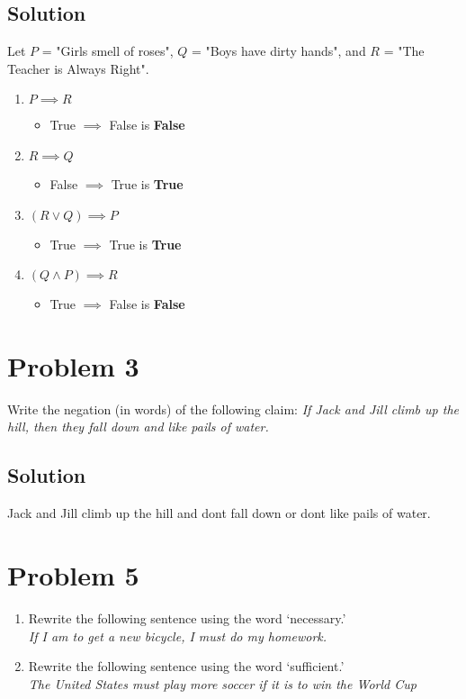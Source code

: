 \documentclass[12pt]{extarticle}
\begin{document}
\subsection*{Solution}

Let $P$ = "Girls smell of roses", $Q$ = "Boys have dirty hands", and $R$ = "The Teacher is Always Right".

\begin{enumerate}[label=(\alph*)]
	\item $P \implies R$
	\begin{itemize}
		\item True $\implies$ False is \textbf{False}
	\end{itemize}
	\item $R \implies Q$
	\begin{itemize}
		\item False $\implies$ True is \textbf{True}
	\end{itemize}
	\item $(R\lor Q) \implies P$
	\begin{itemize}
		\item True $\implies$ True is \textbf{True}
	\end{itemize}
	\item $(Q\land P) \implies R$
	\begin{itemize}
		\item True $\implies$ False is \textbf{False}
	\end{itemize}
\end{enumerate}

\section*{Problem 3}

Write the negation (in words) of the following claim: \textit{If Jack and Jill climb up the hill, then they fall down and like pails of water.}

\subsection*{Solution}

Jack and Jill climb up the hill and dont fall down or dont like pails of water.

\section*{Problem 5}

\begin{enumerate}[label=(\alph*)]
	\item Rewrite the following sentence using the word ‘necessary.’ \\
		\textit{If I am to get a new bicycle, I must do my homework.}
	\item Rewrite the following sentence using the word ‘sufficient.’ \\
		\textit{The United States must play more soccer if it is to win the World Cup}
\end{enumerate}
\end{document}
